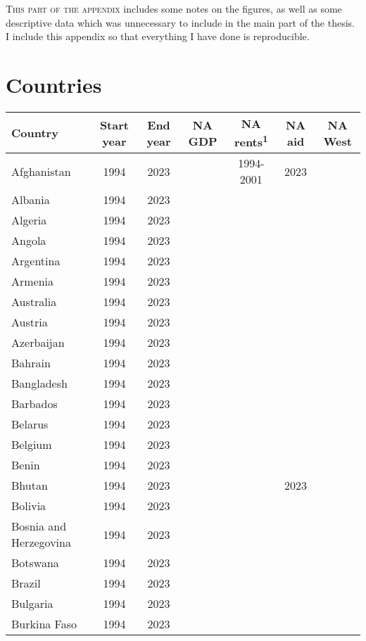 \lettrine{T}{his part of the appendix} includes some notes on the figures, as well as some descriptive data which was unnecessary to include in the main part of the thesis. I include this appendix so that everything I have done is reproducible.

\section{Countries} \label{sec:countries}



{\fontsize{8pt}{8pt}\selectfont\tabcolsep=2pt\centering  %
\begin{longtable}{lcccccc}
\toprule
Country & Start year & End year & NA GDP & NA rents\textsuperscript{1} & NA aid & NA West\\
\midrule
Afghanistan & 1994 & 2023 &  & 1994-2001 & 2023 & \\
Albania & 1994 & 2023 &  &  &  & \\
Algeria & 1994 & 2023 &  &  &  & \\
Angola & 1994 & 2023 &  &  &  & \\
Argentina & 1994 & 2023 &  &  &  & \\
\addlinespace
Armenia & 1994 & 2023 &  &  &  & \\
Australia & 1994 & 2023 &  &  &  & \\
Austria & 1994 & 2023 &  &  &  & \\
Azerbaijan & 1994 & 2023 &  &  &  & \\
Bahrain & 1994 & 2023 &  &  &  & \\
\addlinespace
Bangladesh & 1994 & 2023 &  &  &  & \\
Barbados & 1994 & 2023 &  &  &  & \\
Belarus & 1994 & 2023 &  &  &  & \\
Belgium & 1994 & 2023 &  &  &  & \\
Benin & 1994 & 2023 &  &  &  & \\
\addlinespace
Bhutan & 1994 & 2023 &  &  & 2023 & \\
Bolivia & 1994 & 2023 &  &  &  & \\
Bosnia and Herzegovina & 1994 & 2023 &  &  &  & \\
Botswana & 1994 & 2023 &  &  &  & \\
Brazil & 1994 & 2023 &  &  &  & \\
\addlinespace
Bulgaria & 1994 & 2023 &  &  &  & \\
Burkina Faso & 1994 & 2023 &  &  &  & \\

\end{longtable}}
